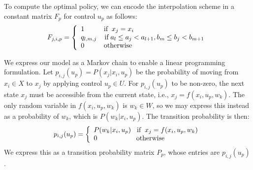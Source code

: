 \documentclass[conference]{IEEEtran}
\begin{document}

To compute the optimal policy, we can encode the interpolation scheme in a constant matrix $F_{p}$ for control $u_{p}$ as follows:
\begin{displaymath}
F_{j,i,p}=
\left\{
\begin{array}{l}
1		   \hspace{1cm} \text{if} \hspace{0.2cm}x_{j}=x_{i}\\
q_{l,m,j}\hspace{0.4cm} \text{if} \hspace{0.1cm} a_{l}\leq a_{j}< a_{l+1}, b_{m}\leq b_{j}< b_{m+1}\\
0		   \hspace{1cm} \text{otherwise}
\end{array}
\right.
\end{displaymath}%

We express our model as a Markov chain to enable a linear programming formulation. Let $p_{i,j}(u_{p})=P(x_{j}| x_{i},u_{p})$ be the probability of moving from $x_{i}\in X$ to $x_{j}$ by applying control $u_{p}\in U$. For $p_{i,j}(u_{p})$ to be non-zero, the next state $x_{j}$ must be accessible from the current state, i.e., $x_{j}=f(x_{i},u_{p},w_{k})$. The only random variable in $f(x_{i},u_{p},w_{k})$ is $w_{k}\in W$, so we may express this instead as a probability of $w_{k}$, which is $P(w_{k} | x_{i},u_{p})$. The transition probability is then:
\begin{equation} \label{eq:TransMtx}
p_{i,j}(u_{p})=
\left\{
\begin{array}{l}
P(w_{k}|x_{i},u_{p}) \hspace{0.3cm} \text{if} \hspace{0.2cm} x_{j}=f(x_{i},u_{p},w_{k})\\
0 \hspace{2.0cm} \text{otherwise}
\end{array}
\right.
\end{equation} We express this as a transition probability matrix $P_{p}$, whose entries are $p_{i,j}(u_{p})$.  
\end{document}
